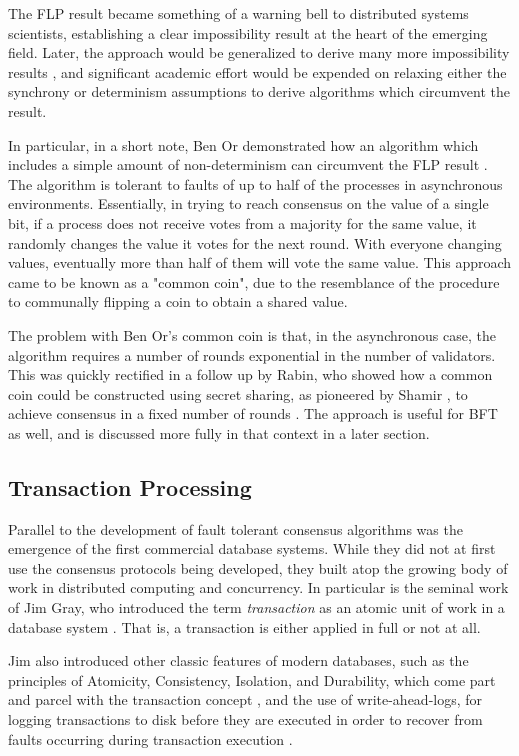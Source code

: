 The FLP result became something of a warning bell to distributed systems scientists, 
establishing a clear impossibility result at the heart of the emerging field.
Later, the approach would be generalized to derive many more impossibility results \cite{impossibility},
and significant academic effort would be expended on relaxing either the synchrony or determinism assumptions to derive algorithms which circumvent the result.

In particular, in a short note, 
Ben Or demonstrated how an algorithm which includes a simple amount of non-determinism can circumvent the FLP result \cite{free-choice}.
The algorithm is tolerant to faults of up to half of the processes in asynchronous environments.
Essentially, in trying to reach consensus on the value of a single bit, 
if a process does not receive votes from a majority for the same value, it randomly changes the value it votes for the next round.
With everyone changing values, eventually more than half of them will vote the same value.
This approach came to be known as a "common coin", 
due to the resemblance of the procedure to communally flipping a coin to obtain a shared value.

The problem with Ben Or's common coin is that, in the asynchronous case,
the algorithm requires a number of rounds exponential in the number of validators.
This was quickly rectified in a follow up by Rabin, who showed how a common coin
could be constructed using secret sharing, as pioneered by Shamir \cite{shamir1979share},
to achieve consensus in a fixed number of rounds \cite{rabin1983randomized}.
The approach is useful for BFT as well, and is discussed more fully in that context in a later section.

\subsection{Transaction Processing}

Parallel to the development of fault tolerant consensus algorithms was the emergence of the first commercial database systems.
While they did not at first use the consensus protocols being developed, 
they built atop the growing body of work in distributed computing and concurrency.
In particular is the seminal work of Jim Gray, who introduced the term \emph{transaction} 
as an atomic unit of work in a database system \cite{gray1981transaction}. 
That is, a transaction is either applied in full or not at all.

Jim also introduced other classic features of modern databases,
such as the principles of Atomicity, Consistency, Isolation, and Durability, 
which come part and parcel with the transaction concept \cite{gray1981transaction},
and the use of write-ahead-logs, for logging transactions to disk before they are executed
in order to recover from faults occurring during transaction execution \cite{gray1978notes}.

